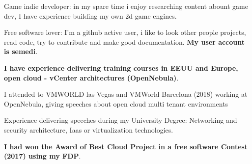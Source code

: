 

\vspace{5mm}

      \begin{cvitems} %
        \item{Game indie developer: in my spare time i enjoy researching content abount game dev, I have experience building my own 2d game engines.}
        \item{Free software lover: I'm a github active user, i like to look other people projects, read code, try to contribute and make good documentation. \textbf{My user account is semedi}.}
        \item{\textbf{I have experience delivering training courses in EEUU and Europe, open cloud - vCenter architectures (OpenNebula)}.}
        \item{I attended to VMWORLD las Vegas and VMWorld Barcelona (2018) working at OpenNebula, giving speeches about open cloud multi tenant environments}
        \item{Experience delivering speeches during my University Degree: Networking and security architecture, Iaas or virtualization technologies.}
        \item{\textbf{I had won the Award of Best Cloud Project in a free software Contest (2017) using  my FDP}.}
      \end{cvitems}
